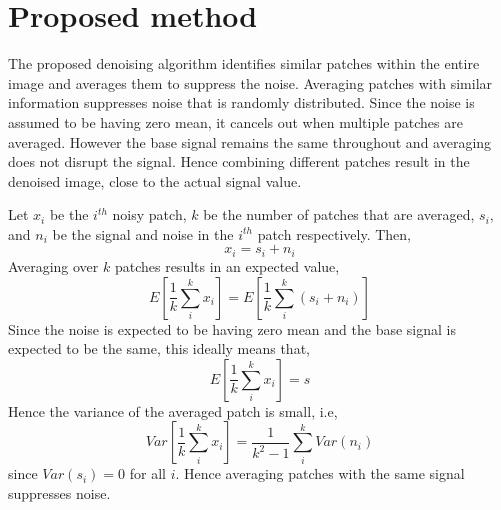 \documentclass[fleqn,10pt]{wlscirep}
\begin{document}
\section*{Proposed method}

The proposed denoising algorithm identifies similar patches within the entire image and averages them to suppress the noise. Averaging patches with similar information suppresses noise that is randomly distributed. Since the noise is assumed to be having zero mean, it cancels out when multiple patches are averaged. However the base signal remains the same throughout and averaging does not disrupt the signal. Hence combining different patches result in the denoised image, close to the actual signal value. 

Let $x_{i}$ be the $i^{th}$ noisy patch, $k$ be the number of patches that are averaged, $s_i$, and $n_i$ be the signal and noise in the $i^{th}$ patch respectively. Then,
\begin{equation}
	x_i = s_i + n_i
\end{equation}
Averaging over $k$ patches results in an expected value,
\begin{equation}
	E[\frac{1}{k}\sum_{i}^{k}x_i ] = E[\frac{1}{k}\sum_{i}^{k}(s_i + n_i) ]
\end{equation}
Since the noise is expected to be having zero mean and the base signal is expected to be the same, this ideally means that,
\begin{equation}
	E[\frac{1}{k}\sum_{i}^{k}x_i ] = s
\end{equation}
Hence the variance of the averaged patch is small, i.e,
\begin{equation}
	Var[\frac{1}{k}\sum_{i}^{k}x_i ] = \frac{1}{k^2 -1} \sum_{i}^{k}Var(n_i)
\end{equation}
since $Var(s_i) = 0$ for all $i$. Hence averaging patches with the same signal suppresses noise.


\end{document}
